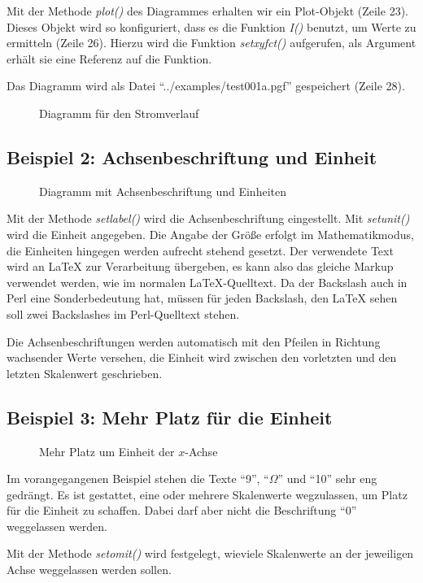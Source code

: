 \documentclass[ngerman,origlongtable]{scrartcl}
\newcommand{\includepgfimage}[2]{%
\begin{figure}%
{\centering%
\caption{#2}\label{fig:#1}%
}%
\end{figure}%
}
\begin{document}
Mit der Methode \textit{plot()\/} des Diagrammes erhalten wir ein
Plot-Objekt (Zeile 23). Dieses Objekt wird so konfiguriert, dass es
die Funktion \textit{I()\/} benutzt, um Werte zu ermitteln (Zeile 26).
Hierzu wird die Funktion
\textit{set\textunderscore{}xy\textunderscore{}fct()\/} aufgerufen,
als Argument erhält sie eine Referenz auf die Funktion.

Das Diagramm wird als Datei "`../examples/test001a.pgf"' gespeichert
(Zeile 28).

\includepgfimage{../examples/test001a}{Diagramm für den Stromverlauf}
\clearpage
\subsection[Beschriftung]{Beispiel 2: Achsenbeschriftung und Einheit}

\includepgfimage{../examples/test002a}{Diagramm mit Achsenbeschriftung und Einheiten}
Mit der Methode \textit{set\textunderscore{}label()\/} wird die
Achsenbeschriftung eingestellt. Mit
\textit{set\textunderscore{}unit()\/} wird die Einheit angegeben.
Die Angabe der Größe erfolgt im Mathematikmodus,
die Einheiten hingegen werden aufrecht stehend gesetzt. Der verwendete
Text wird an \LaTeX{} zur Verarbeitung übergeben, es kann also das gleiche
Markup verwendet werden, wie im normalen \LaTeX{}-Quelltext.
Da der Backslash auch in Perl eine Sonderbedeutung hat, müssen für jeden
Backslash, den \LaTeX{} sehen soll zwei Backslashes im Perl-Quelltext
stehen.

Die Achsenbeschriftungen werden automatisch mit den Pfeilen in Richtung
wachsender Werte versehen, die Einheit wird zwischen den vorletzten
und den letzten Skalenwert geschrieben.
\clearpage
\subsection[Platz für Einheit]{Beispiel 3: Mehr Platz für die Einheit}
\includepgfimage{../examples/test003a}{Mehr Platz um Einheit der \(x\)-Achse}
Im vorangegangenen Beispiel stehen die Texte "`9"', "`\(\Omega\)"' und "`10"'
sehr eng gedrängt. Es ist gestattet, eine oder mehrere Skalenwerte wegzulassen,
um Platz für die Einheit zu schaffen. Dabei darf aber nicht die Beschriftung
"`0"' weggelassen werden.

Mit der Methode \textit{set\textunderscore{}omit()\/} wird festgelegt,
wieviele Skalenwerte an der jeweiligen Achse weggelassen werden sollen.

\clearpage
\end{document}
